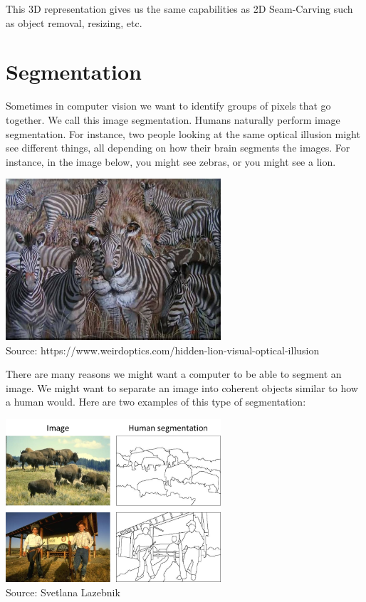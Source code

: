 \documentclass{article}
\begin{document}
This 3D representation gives us the same capabilities as 2D Seam-Carving such as object removal, resizing, etc.
\section{Segmentation}
Sometimes in computer vision we want to identify groups of pixels that go together. We call this image segmentation. Humans naturally perform image segmentation. For instance, two people looking at the same optical illusion might see different things, all depending on how their brain segments the images. For instance, in the image below, you might see zebras, or you might see a lion. 
\begin{center}
\includegraphics[width=8cm]{lion.jpg} \\
Source: https://www.weirdoptics.com/hidden-lion-visual-optical-illusion
\end{center}

There are many reasons we might want a computer to be able to segment  an image. We might want to separate an image into coherent objects similar to how a human would. Here are two examples of this type of segmentation:

\begin{center}
\includegraphics[width=8cm]{objects.png} \\
Source:  Svetlana Lazebnik
\end{center}
\end{document}
